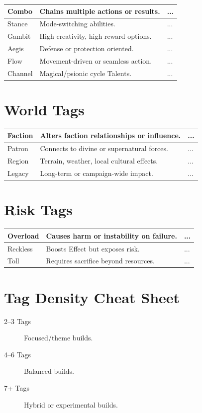 \documentclass[11pt]{book}
\begin{document}
\begin{longtable}{|p{3cm}|p{6cm}|p{4cm}|}
\hline
Combo & Chains multiple actions or results. & ... \\ \hline
Stance & Mode-switching abilities. & ... \\ \hline
Gambit & High creativity, high reward options. & ... \\ \hline
Aegis & Defense or protection oriented. & ... \\ \hline
Flow & Movement-driven or seamless action. & ... \\ \hline
Channel & Magical/psionic cycle Talents. & ... \\ \hline
\end{longtable}

\section{World Tags}

\begin{longtable}{|p{3cm}|p{6cm}|p{4cm}|}
\hline
Faction & Alters faction relationships or influence. & ... \\ \hline
Patron & Connects to divine or supernatural forces. & ... \\ \hline
Region & Terrain, weather, local cultural effects. & ... \\ \hline
Legacy & Long-term or campaign-wide impact. & ... \\ \hline
\end{longtable}

\section{Risk Tags}

\begin{longtable}{|p{3cm}|p{6cm}|p{4cm}|}
\hline
Overload & Causes harm or instability on failure. & ... \\ \hline
Reckless & Boosts Effect but exposes risk. & ... \\ \hline
Toll & Requires sacrifice beyond resources. & ... \\ \hline
\end{longtable}

\section{Tag Density Cheat Sheet}

\begin{description}
    \item[2--3 Tags] Focused/theme builds.
    \item[4--6 Tags] Balanced builds.
    \item[7+ Tags] Hybrid or experimental builds.
\end{description}
\end{document}
